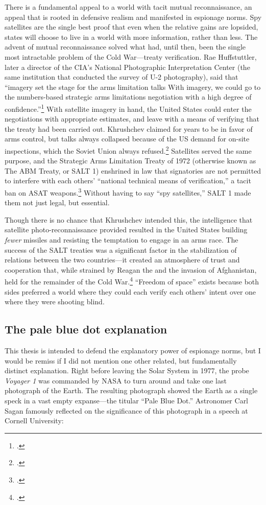 \documentclass[11pt]{memoir}
\begin{document}
There is a fundamental appeal to a world with tacit mutual reconnaissance, an appeal that is rooted in defensive realism and manifested in espionage norms. Spy satellites are the single best proof that even when the relative gains are lopsided, states will choose to live in a world with more information, rather than less. The advent of mutual reconnaissance solved what had, until then, been the single most intractable problem of the Cold War---treaty verification. Rae Huffstuttler, later a director of the CIA's National Photographic Interpretation Center (the same institution that conducted the survey of U-2 photography), said that ``imagery set the stage for the arms limitation talks \textelp{} With imagery, we could go to the numbers-based strategic arms limitations negotiation with a high degree of confidence.''\footcite[p.~403]{brugioni_eyes_2010} With satellite imagery in hand, the United States could enter the negotiations with appropriate estimates, and leave with a means of verifying that the treaty had been carried out. Khrushchev claimed for years to be in favor of arms control, but talks always collapsed because of the US demand for on-site inspections, which the Soviet Union always refused.\footcite[p.~255]{mcdougall_heavens_1985} Satellites served the same purpose, and the Strategic Arms Limitation Treaty of 1972 (otherwise known as The ABM Treaty, or SALT 1) enshrined in law that signatories are not permitted to interfere with each others' ``national technical means of verification,'' a tacit ban on ASAT weapons.\footcite[p.~431]{mcdougall_heavens_1985} Without having to say ``spy satellites,'' SALT 1 made them not just legal, but essential.

Though there is no chance that Khrushchev intended this, the intelligence that satellite photo-reconnaissance provided resulted in the United States building \emph{fewer} missiles and resisting the temptation to engage in an arms race. The success of the SALT treaties was a significant factor in the stabilization of relations between the two countries---it created an atmosphere of trust and cooperation that, while strained by Reagan the and the invasion of Afghanistan, held for the remainder of the Cold War.\footcite[p.~179]{lindgren_trust_2000} ``Freedom of space'' exists because both sides preferred a world where they could each verify each others' intent over one where they were shooting blind.

\subsection{The pale blue dot explanation}
This thesis is intended to defend the explanatory power of espionage norms, but I would be remiss if I did not mention one other related, but fundamentally distinct explanation. Right before leaving the Solar System in 1977, the probe \emph{Voyager 1} was commanded by NASA to turn around and take one last photograph of the Earth. The resulting photograph showed the Earth as a single speck in a vast empty expanse---the titular ``Pale Blue Dot.'' Astronomer Carl Sagan famously reflected on the significance of this photograph in a speech at Cornell University:
\end{document}

